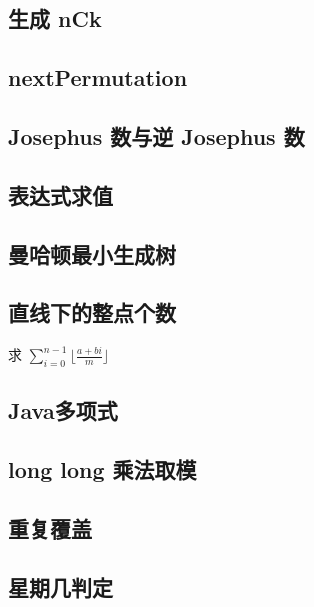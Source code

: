 \documentclass[landscape, twocolumn, 8pt, a4paper, twoside]{extarticle}
\begin{document}
\subsection{生成 nCk}


\subsection{nextPermutation}


\subsection{Josephus 数与逆 Josephus 数}


\subsection{表达式求值}


\subsection{曼哈顿最小生成树}


\subsection{直线下的整点个数}
求 $\sum_{i=0}^{n-1} \lfloor\frac{a+bi}{m}\rfloor$


\subsection{Java多项式}


\subsection{long long 乘法取模}


\subsection{重复覆盖}


\subsection{星期几判定}

\end{document}
